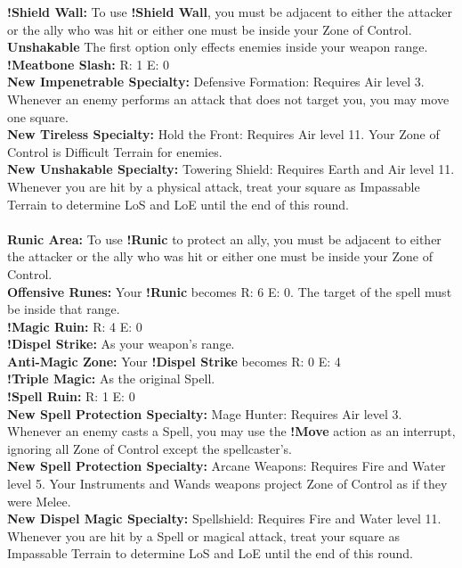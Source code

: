 \textbf{!Shield Wall:} To use \textbf{!Shield Wall}, you must be adjacent to either the attacker or the ally who was hit or either one must be inside your Zone of Control.\\
\textbf{Unshakable} The first option only effects enemies inside your weapon range.\\
\textbf{!Meatbone Slash:} R: 1 E: 0\\
\textbf{New Impenetrable Specialty:} Defensive Formation: Requires Air level 3. Whenever an enemy performs an attack that does not target you, you may move one square.\\
\textbf{New Tireless Specialty:} Hold the Front: Requires Air level 11. Your Zone of Control is Difficult Terrain for enemies.\\
\textbf{New Unshakable Specialty:} Towering Shield: Requires Earth and Air level 11. Whenever you are hit by a physical attack, treat your square as Impassable Terrain to determine LoS and LoE until the end of this round.
%
\\\\
%
 \ofrow
\textbf{Runic Area:} To use \textbf{!Runic} to protect an ally, you must be adjacent to either the attacker or the ally who was hit or either one must be inside your Zone of Control.\\
\textbf{Offensive Runes:} Your \textbf{!Runic} becomes R: 6 E: 0. The target of the spell must be inside that range.\\
\textbf{!Magic Ruin:} R: 4 E: 0\\
\textbf{!Dispel Strike:} As your weapon’s range.\\
\textbf{Anti-Magic Zone:} Your \textbf{!Dispel Strike} becomes R: 0 E: 4\\
\textbf{!Triple Magic:} As the original Spell.\\
\textbf{!Spell Ruin:} R: 1 E: 0\\
\textbf{New Spell Protection Specialty:} Mage Hunter: Requires Air level 3. Whenever an enemy casts a Spell, you may use the \textbf{!Move} action as an interrupt, ignoring all Zone of Control except the spellcaster's.\\
\textbf{New Spell Protection Specialty:} Arcane Weapons: Requires Fire and Water level 5. Your Instruments and Wands weapons project Zone of Control as if they were Melee.\\
\textbf{New Dispel Magic Specialty:} Spellshield: Requires Fire and Water level 11. Whenever you are hit by a Spell or magical attack, treat your square as Impassable Terrain to determine LoS and LoE until the end of this round.
